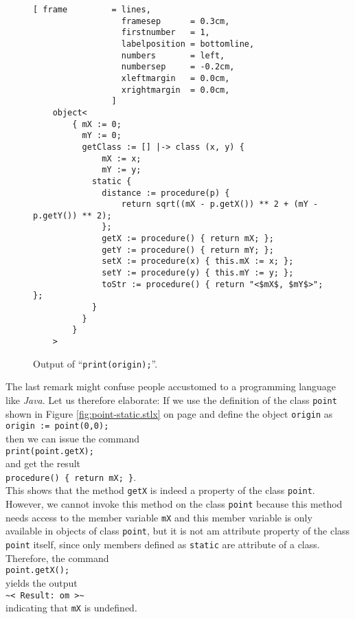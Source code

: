 \begin{figure}[!ht]
\centering
\begin{Verbatim}[ frame         = lines, 
                  framesep      = 0.3cm, 
                  firstnumber   = 1,
                  labelposition = bottomline,
                  numbers       = left,
                  numbersep     = -0.2cm,
                  xleftmargin   = 0.0cm,
                  xrightmargin  = 0.0cm,
                ]
    object<
        { mX := 0; 
          mY := 0; 
          getClass := [] |-> class (x, y) { 
              mX := x; 
              mY := y; 
            static { 
              distance := procedure(p) { 
                  return sqrt((mX - p.getX()) ** 2 + (mY - p.getY()) ** 2); 
              }; 
              getX := procedure() { return mX; }; 
              getY := procedure() { return mY; }; 
              setX := procedure(x) { this.mX := x; }; 
              setY := procedure(y) { this.mY := y; }; 
              toStr := procedure() { return "<$mX$, $mY$>"; }; 
            } 
          }
        }
    >
\end{Verbatim}
\vspace*{-0.3cm}
\caption{Output of ``\texttt{print(origin);}''.}
\label{fig:point-static.stlx-origin}
\end{figure}

The last remark might confuse people accustomed to a programming language like \textsl{Java}.  Let
us therefore elaborate: If we use the definition of the class \texttt{point} shown in Figure
\ref{fig:point-static.stlx} on page \pageref{fig:point-static.stlx} and define the object
\texttt{origin} as
\\[0.2cm]
\hspace*{1.3cm}
\texttt{origin := point(0,0);}
\\[0.2cm]
then we can issue the command
\\[0.2cm]
\hspace*{1.3cm}
\texttt{print(point.getX);}
\\[0.2cm]
and get the result
\\[0.2cm]
\hspace*{1.3cm}
\texttt{procedure() \{ return mX; \}}.
\\[0.2cm]
This shows that the method \texttt{getX} is indeed a property of the class \texttt{point}.  However, 
we cannot invoke this method on the class \texttt{point} because this method needs access to the
member variable \texttt{mX} and this member variable is only available in objects of class
\texttt{point}, but it is not am attribute property of the class \texttt{point} itself, since only members
defined as \texttt{static} are attribute of a class.  Therefore, the command
\\[0.2cm]
\hspace*{1.3cm}
\texttt{point.getX();}
\\[0.2cm]
yields the output
\\[0.2cm]
\hspace*{1.3cm}
\texttt{\~{}< Result: om >\~}
\\[0.2cm]
indicating that \texttt{mX} is undefined.  

